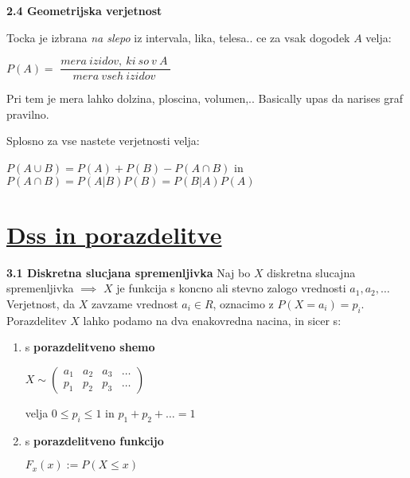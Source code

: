 \documentclass{article}
\begin{document}
\begin{multicols}{3}
\textbf{2.4 Geometrijska verjetnost}


Tocka je izbrana \textit{na slepo} iz intervala, lika, telesa.. ce za
vsak dogodek $A$ velja:
\begin{center}
    \begin{math}
        P(A) =
    \end{math}
    \smallskip
    \begin{math}
       \dfrac{
        mera\: izidov,\: ki\: so\: v\: A\:
        }
       {mera\: vseh\: izidov\:}
    \end{math}
\end{center}
Pri tem je mera lahko dolzina, ploscina, volumen,..
Basically upas da narises graf pravilno.

Splosno za vse nastete verjetnosti velja:
\begin{center}
    \begin{math}
    P(A \cup B) = P(A) + P(B) - P(A \cap B)
    \end{math} in 
    \begin{math}
        P(A \cap B) = P(A | B) P(B) = P(B | A) P(A)
    \end{math}
\end{center}

\section{\underline{Dss in porazdelitve}}

\textbf{3.1 Diskretna slucjana spremenljivka}
Naj bo $X$ diskretna slucajna spremenljivka $\implies$ $X$ je funkcija
s koncno ali stevno zalogo  vrednosti ${ a_{1}, a_{2}, \dots}$ Verjetnost, 
da $X$ zavzame vrednost $a_{i} \in R$, oznacimo z $P(X = a_{i}) = p_{i}$. Porazdelitev
$X$ lahko podamo na dva enakovredna nacina, in sicer s:
\begin{enumerate}
    \item s \textbf{porazdelitveno shemo}
        \begin{center}
            \begin{math}
                X \sim
                \begin{pmatrix}
                    a_{1} & a_{2} & a_{3} & \dots \\
                    p_{1} & p_{2} & p_{3} & \dots
                \end{pmatrix}
            \end{math}
        \end{center}
        velja $0 \leq p_{i} \leq 1$ in $p_{1} + p_{2} + \dots = 1$
    \item s \textbf{porazdelitveno funkcijo}
        \begin{center}
            \begin{math}
                F_{x}(x) := P(X \leq x)
            \end{math}
        \end{center}
\end{enumerate}


\end{multicols}
\end{document}
